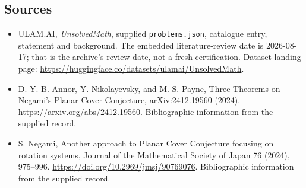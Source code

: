 \documentclass[11pt,a4paper]{article}
\begin{document}
\subsection{Sources}

{\small

\begin{itemize}

\item[\hypertarget{source:statement:1}{S1}] ULAM.AI, \emph{UnsolvedMath}, supplied \texttt{problems.json}, catalogue entry, statement and background. The embedded literature-review date is 2026-08-17; that is the archive’s review date, not a fresh certification. Dataset landing page: \url{https://huggingface.co/datasets/ulamai/UnsolvedMath}.

\item[\hypertarget{source:statement:2}{S2}] D. Y. B. Annor, Y. Nikolayevsky, and M. S. Payne, Three Theorems on Negami's Planar Cover Conjecture, arXiv:2412.19560 (2024). \url{https://arxiv.org/abs/2412.19560}. Bibliographic information from the supplied record.

\item[\hypertarget{source:statement:3}{S3}] S. Negami, Another approach to Planar Cover Conjecture focusing on rotation systems, Journal of the Mathematical Society of Japan 76 (2024), 975–996. \url{https://doi.org/10.2969/jmsj/90769076}. Bibliographic information from the supplied record.

\end{itemize}

}

\label{end:statement}
\end{document}
